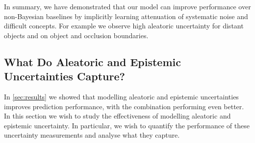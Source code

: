 In summary, we have demonstrated that our model can improve performance over non-Bayesian baselines by implicitly learning attenuation of systematic noise and difficult concepts. For example we observe high aleatoric uncertainty for distant objects and on object and occlusion boundaries.

\subsection{What Do Aleatoric and Epistemic Uncertainties Capture?}

In \cref{sec:results} we showed that modelling aleatoric and epistemic uncertainties improves prediction performance, with the combination performing even better.
In this section we wish to study the effectiveness of modelling aleatoric and epistemic uncertainty. In particular, we wish to quantify the performance of these uncertainty measurements and analyse what they capture.

